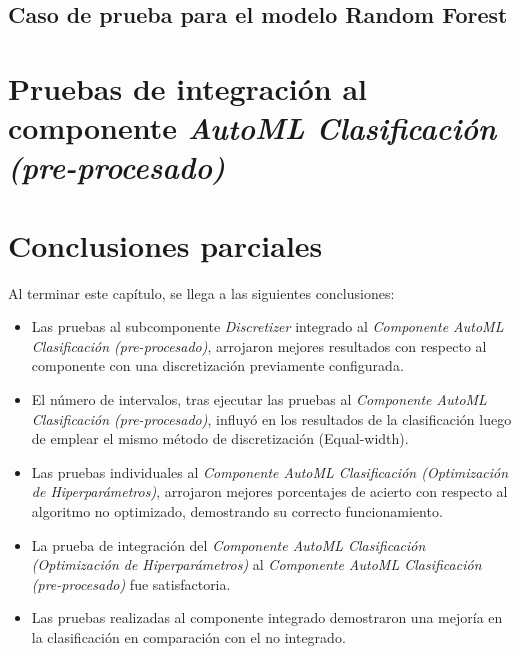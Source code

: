 \subsection{Caso de prueba para el modelo Random Forest}

\section{Pruebas de integración al componente \textit{AutoML Clasificación (pre-procesado)}}



\section{Conclusiones parciales}
Al terminar este capítulo, se llega a las siguientes conclusiones:
\begin{itemize}
	\item Las pruebas al subcomponente \textit{Discretizer} integrado al \textit{Componente AutoML Clasificación (pre-procesado)}, arrojaron mejores resultados con respecto al componente con una discretización previamente configurada.
	\item El número de intervalos, tras ejecutar las pruebas al \textit{Componente AutoML Clasificación (pre-procesado)}, influyó en los resultados de la clasificación luego de emplear el mismo método de discretización (Equal-width).
	\item Las pruebas individuales al \textit{Componente AutoML Clasificación (Optimización de Hiperparámetros)}, arrojaron mejores porcentajes de acierto con respecto al algoritmo no optimizado, demostrando su correcto funcionamiento.
	\item La prueba de integración del \textit{Componente AutoML Clasificación (Optimización de Hiperparámetros)} al \textit{Componente AutoML Clasificación (pre-procesado)} fue satisfactoria.
	\item Las pruebas realizadas al componente integrado demostraron una mejoría en la clasificación en comparación con el no integrado.
\end{itemize}
\pagebreak
